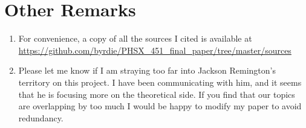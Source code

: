 \documentclass[12pt]{article}
\begin{document}
\section{Other Remarks}
\begin{enumerate}
\item For convenience, a copy of all the sources I cited is available at \url{https://github.com/byrdie/PHSX_451_final_paper/tree/master/sources}
\item Please let me know if I am straying too far into Jackson Remington's territory on this project. I have been communicating with him, and it seems that he is focusing more on the theoretical side. If you find that our topics are overlapping by too much I would be happy to modify my paper to avoid redundancy.
\end{enumerate}
\end{document}
